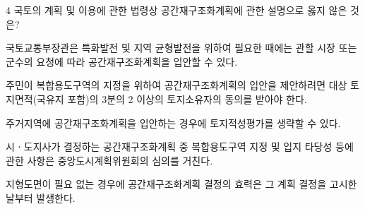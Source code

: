 \begin{question}{4}
국토의 계획 및 이용에 관한 법령상 공간재구조화계획에 관한 설명으로 옳지 않은 것은?
\begin{choices}
  \item 국토교통부장관은 특화발전 및 지역 균형발전을 위하여 필요한 때에는 관할 시장 또는 군수의 요청에 따라 공간재구조화계획을 입안할 수 있다.
  \item 주민이 복합용도구역의 지정을 위하여 공간재구조화계획의 입안을 제안하려면 대상 토지면적(국유지 포함)의 3분의 2 이상의 토지소유자의 동의를 받아야 한다.
  \item 주거지역에 공간재구조화계획을 입안하는 경우에 토지적성평가를 생략할 수 있다.
  \item 시ㆍ도지사가 결정하는 공간재구조화계획 중 복합용도구역 지정 및 입지 타당성 등에 관한 사항은 중앙도시계획위원회의 심의를 거친다.
  \item 지형도면이 필요 없는 경우에 공간재구조화계획 결정의 효력은 그 계획 결정을 고시한 날부터 발생한다.
\end{choices}
\end{question}
